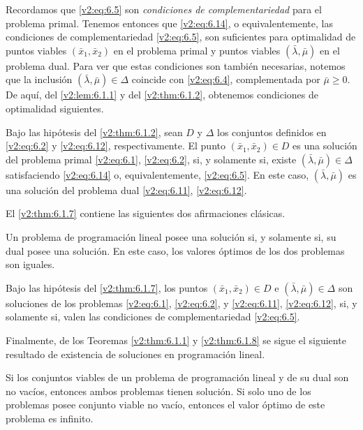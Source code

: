 Recordamos que \eqref{v2:eq:6.5} son \textit{condiciones de complementariedad} para el problema primal. Tenemos entonces que \eqref{v2:eq:6.14}, o equivalentemente, las condiciones de complementariedad \eqref{v2:eq:6.5}, son suficientes para optimalidad de puntos viables $(\bar{x}_1, \bar{x}_2)$ en el problema primal y puntos viables $(\bar{\lambda}, \bar{\mu})$ en el problema dual. Para ver que estas condiciones son también necesarias, notemos que la inclusión $(\bar{\lambda}, \bar{\mu}) \in \Delta$ coincide con \eqref{v2:eq:6.4}, complementada por $\bar{\mu} \ge 0$. De aquí, del \cref{v2:lem:6.1.1} y del \cref{v2:thm:6.1.2}, obtenemos condiciones de optimalidad siguientes.

\begin{theorem}\label{v2:thm:6.1.7}
    Bajo las hipótesis del \cref{v2:thm:6.1.2}, sean $D$ y $\Delta$ los conjuntos definidos en \eqref{v2:eq:6.2} y \eqref{v2:eq:6.12}, respectivamente.
    El punto $(\bar{x}_1, \bar{x}_2) \in D$ es una solución del problema primal \eqref{v2:eq:6.1}, \eqref{v2:eq:6.2}, si, y solamente si, existe $(\bar{\lambda}, \bar{\mu}) \in \Delta$ satisfaciendo \eqref{v2:eq:6.14} o, equivalentemente, \eqref{v2:eq:6.5}. En este caso, $(\bar{\lambda}, \bar{\mu})$ es una solución del problema dual \eqref{v2:eq:6.11}, \eqref{v2:eq:6.12}.
\end{theorem}

El \cref{v2:thm:6.1.7} contiene las siguientes dos afirmaciones clásicas.

\begin{theorem}\label{v2:thm:6.1.8}
    Un problema de programación lineal posee una solución si, y solamente si, su dual posee una solución.
    En este caso, los valores óptimos de los dos problemas son iguales.
\end{theorem}

\begin{theorem}\label{v2:thm:6.1.9}
    Bajo las hipótesis del \cref{v2:thm:6.1.7}, los puntos $(\bar{x}_1, \bar{x}_2) \in D$ e $(\bar{\lambda}, \bar{\mu}) \in \Delta$ son soluciones de los problemas \eqref{v2:eq:6.1}, \eqref{v2:eq:6.2}, y \eqref{v2:eq:6.11}, \eqref{v2:eq:6.12}, si, y solamente si, valen las condiciones de complementariedad \eqref{v2:eq:6.5}.
\end{theorem}

Finalmente, de los Teoremas \ref{v2:thm:6.1.1} y \ref{v2:thm:6.1.8} se sigue el siguiente resultado de existencia de soluciones en programación lineal.

\begin{theorem}\label{v2:thm:6.1.10}
    Si los conjuntos viables de un problema de programación lineal y de su dual son no vacíos, entonces ambos problemas tienen solución. Si solo uno de los problemas posee conjunto viable no vacío, entonces el valor óptimo de este problema es infinito.
\end{theorem}


